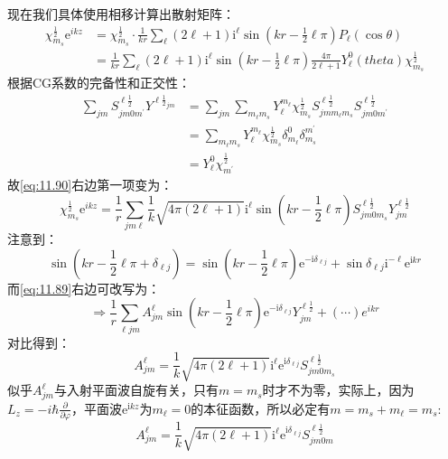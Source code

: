 \documentclass[a4paper,zihao=-4,linespread=1]{ctexrep}
\begin{document}
	现在我们具体使用相移计算出散射矩阵：
	\begin{equation}
		\begin{aligned}
			\chi_{m_s}^\frac{1}{2}\mathrm{e}^{ikz}&=\chi_{m_s}^\frac{1}{2}\cdot\frac{1}{kr}\sum_\ell(2\ell+1)\mathrm{i}^\ell\sin\left(kr-\frac{1}{2}\ell\pi\right)P_\ell(\cos\theta)\\
			&=\frac{1}{kr}\sum_\ell(2\ell+1)\mathrm{i}^\ell\sin\left(kr-\frac{1}{2}\ell\pi\right)\frac{4\pi}{2\ell+1}Y_\ell^0(theta)\chi_{m_s}^\frac{1}{2}
		\end{aligned}
	\end{equation}
	根据CG系数的完备性和正交性：
	\begin{equation}
		\begin{aligned}
			\sum_{jm}S_{jm0m^\prime}^{\ell\frac{1}{2}}Y^{\ell\frac{1}{2}_{jm}}&=\sum_{jm}\sum_{m_\ell m_s}Y_\ell^{m_\ell}\chi_{m_s}^\frac{1}{2}S_{jmm_\ell m_s}^{\ell\frac{1}{2}}S_{jm0m^\prime}^{\ell\frac{1}{2}}
			\\
			&=\sum_{m_\ell m_s}Y_\ell^{m_\ell}\chi_{m_s}^\frac{1}{2}\delta_{m_\ell}^0\delta_{m_s}^{m^\prime}\\
			&=Y_\ell^0\chi^\frac{1}{2}_{m^\prime}
		\end{aligned}
	\end{equation}
	故\ref{eq:11.90}右边第一项变为：
	\begin{equation}
		\chi_{m_s}^\frac{1}{2}\mathrm{e}^{ikz}=\frac{1}{r}\sum_{jm\ell}\frac{1}{k}\sqrt{4\pi(2\ell+1)}\mathrm{i}^\ell\sin\left(kr-\frac{1}{2}\ell\pi\right)S^{\ell\frac{1}{2}}_{jm0m_s}Y_{jm}^{\ell\frac{1}{2}}
	\end{equation}
	注意到：
	\[\sin\left(kr-\frac{1}{2}\ell\pi+\delta_{\ell j}\right)=\sin\left(kr-\frac{1}{2}\ell\pi\right)\mathrm{e}^{-\mathrm{i}\delta_{\ell j}}+\sin\delta_{\ell j}\mathrm{i}^{-\ell}\mathrm{e}^{\mathrm{i}kr}\]
	而\ref{eq:11.89}右边可改写为：
	\begin{equation}
		\Rightarrow\frac{1}{r}\sum_{\ell j m} A_{jm}^\ell \sin\left(kr-\frac{1}{2}\ell\pi\right)\mathrm{e}^{-\mathrm{i}\delta_{\ell j}} Y^{\ell\frac{1}{2}}_{jm}+(\cdots)e^{ikr}
	\end{equation}
	对比得到：
	\[A_{jm}^\ell=\frac{1}{k}\sqrt{4\pi(2\ell+1)}\mathrm{i}^\ell\mathrm{e}^{\mathrm{i}\delta_{\ell j}}S^{\ell\frac{1}{2}}_{jm0m_s}\]
	似乎$A_{jm}^\ell$与入射平面波自旋有关，只有$m=m_s$时才不为零，实际上，因为$L_z=-i\hbar\frac{\partial}{\partial\varphi}$，平面波$\mathrm{e}^{\mathrm{i}kz}$为$m_\ell=0$的本征函数，所以必定有$m=m_s+m_\ell=m_s$:
	\begin{equation}
		A_{jm}^\ell=\frac{1}{k}\sqrt{4\pi(2\ell+1)}\mathrm{i}^\ell\mathrm{e}^{\mathrm{i}\delta_{\ell j}}S^{\ell\frac{1}{2}}_{jm0m}
	\end{equation}
\end{document}
